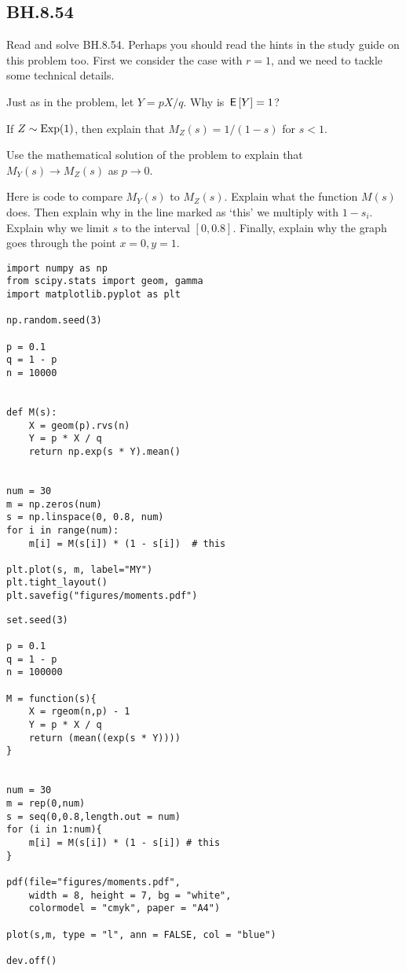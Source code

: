 \subsection{BH.8.54}
\label{sec:bh.8.54}


Read and solve BH.8.54. Perhaps you should read the hints in the study guide on this problem too.
First we consider the case with $r=1$, and we need to tackle some technical details.

\begin{exercise}
Just as in the problem, let $Y=p X/ q$. Why is $\,\mathsf{E}\left[Y\right] = 1$?
\end{exercise}

\begin{exercise}
If $Z\sim\mathrm{Exp}(1)$, then explain that $M_Z(s) = 1/(1-s)$ for $s<1$.
\end{exercise}

\begin{exercise}
Use the mathematical solution of the problem to explain that $M_Y(s)\to M_Z(s)$ as $p\to 0$.
\end{exercise}


\begin{exercise}
Here is code to compare $M_Y(s)$ to $M_{Z}(s)$. Explain what the function $M(s)$ does. Then explain why in the line marked as `this' we multiply with $1-s_{i}$.  Explain why we limit $s$ to the interval $[0, 0.8]$. Finally, explain why the graph goes through the point $x=0, y = 1$.

\begin{verbatim}
import numpy as np
from scipy.stats import geom, gamma
import matplotlib.pyplot as plt

np.random.seed(3)

p = 0.1
q = 1 - p
n = 10000


def M(s):
    X = geom(p).rvs(n)
    Y = p * X / q
    return np.exp(s * Y).mean()


num = 30
m = np.zeros(num)
s = np.linspace(0, 0.8, num)
for i in range(num):
    m[i] = M(s[i]) * (1 - s[i])  # this

plt.plot(s, m, label="MY")
plt.tight_layout()
plt.savefig("figures/moments.pdf")
\end{verbatim}


\begin{verbatim}
set.seed(3)

p = 0.1
q = 1 - p
n = 100000

M = function(s){
    X = rgeom(n,p) - 1
    Y = p * X / q
    return (mean((exp(s * Y))))
}


num = 30
m = rep(0,num)
s = seq(0,0.8,length.out = num)
for (i in 1:num){
    m[i] = M(s[i]) * (1 - s[i]) # this
}

pdf(file="figures/moments.pdf",
    width = 8, height = 7, bg = "white",
    colormodel = "cmyk", paper = "A4")

plot(s,m, type = "l", ann = FALSE, col = "blue")

dev.off()
\end{verbatim}
\end{exercise}

